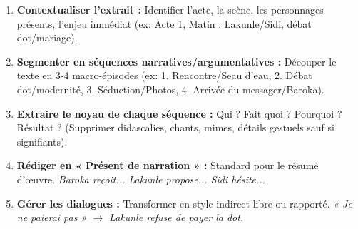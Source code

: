\documentclass[11pt]{article}
\begin{document}
\begin{methode}
    \begin{enumerate}
        \item \textbf{Contextualiser l'extrait :} Identifier l'acte, la scène, les personnages présents, l'enjeu immédiat (ex: Acte 1, Matin : Lakunle/Sidi, débat dot/mariage).
        \item \textbf{Segmenter en séquences narratives/argumentatives :} Découper le texte en 3-4 macro-épisodes (ex: 1. Rencontre/Seau d'eau, 2. Débat dot/modernité, 3. Séduction/Photos, 4. Arrivée du messager/Baroka).
        \item \textbf{Extraire le noyau de chaque séquence :} Qui ? Fait quoi ? Pourquoi ? Résultat ? (Supprimer didascalies, chants, mimes, détails gestuels sauf si signifiants).
        \item \textbf{Rédiger en « Présent de narration » :} Standard pour le résumé d'œuvre. \emph{Baroka reçoit... Lakunle propose... Sidi hésite...}
        \item \textbf{Gérer les dialogues :} Transformer en style indirect libre ou rapporté. \emph{« Je ne paierai pas » $\rightarrow$ Lakunle refuse de payer la dot.}
    \end{enumerate}
\end{methode}
\end{document}
